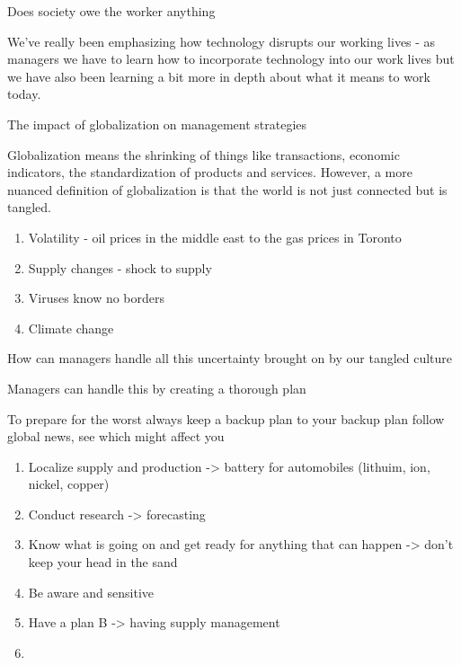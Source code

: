\documentclass[11pt]{article}
\begin{document}
Does society owe the worker anything

We've really been emphasizing how technology disrupts our working lives - as managers we have to learn how to incorporate technology into our work lives but we have also been learning a bit more in depth about what it means to work today.











The impact of globalization on management strategies

Globalization means the shrinking of things like transactions, economic indicators, the standardization of products and services. However, a more nuanced definition of globalization is that the world is not just connected but is tangled.

\begin{enumerate}
    \item Volatility - oil prices in the middle east to the gas prices in Toronto
    \item Supply changes - shock to supply 
    \item Viruses know no borders
    \item Climate change
\end{enumerate}

How can managers handle all this uncertainty brought on by our tangled culture

Managers can handle this by creating a thorough plan

    To prepare for the worst
        always keep a backup plan to your backup plan
    follow global news, see which might affect you


\begin{enumerate}
    \item Localize supply and production -> battery for automobiles (lithuim, ion, nickel, copper)
    \item Conduct research -> forecasting
    \item Know what is going on and get ready for anything that can happen -> don't keep your head in the sand
    \item Be aware and sensitive
    \item Have a plan B -> having supply management
    \item 
\end{enumerate}
\end{document}

